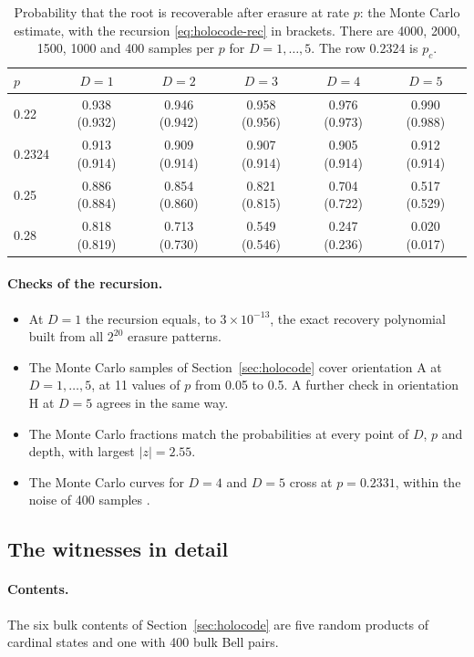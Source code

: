 \begin{table}[ht]\centering\small
\caption{Probability that the root is recoverable after erasure at rate $p$: the Monte Carlo estimate, with the recursion
\eqref{eq:holocode-rec} in brackets. There are 4000, 2000, 1500, 1000 and 400 samples per $p$ for $D=1,\dots,5$. The row $0.2324$
is $p_c$. }\label{tab:holocode-mc}
\begin{tabular}{lccccc}\toprule
$p$ & $D=1$ & $D=2$ & $D=3$ & $D=4$ & $D=5$ \\\midrule
0.22 & 0.938 (0.932) & 0.946 (0.942) & 0.958 (0.956) & 0.976 (0.973) & 0.990 (0.988) \\
0.2324 & 0.913 (0.914) & 0.909 (0.914) & 0.907 (0.914) & 0.905 (0.914) & 0.912 (0.914) \\
0.25 & 0.886 (0.884) & 0.854 (0.860) & 0.821 (0.815) & 0.704 (0.722) & 0.517 (0.529) \\
0.28 & 0.818 (0.819) & 0.713 (0.730) & 0.549 (0.546) & 0.247 (0.236) & 0.020 (0.017) \\\bottomrule
\end{tabular}
\end{table}

\paragraph{Checks of the recursion.}
\begin{itemize}[nosep]
\item At $D=1$ the recursion equals, to $3\times10^{-13}$, the exact recovery polynomial built from all $2^{20}$ erasure patterns.
\item The Monte Carlo samples of Section~\ref{sec:holocode} cover orientation A at $D=1,\dots,5$, at 11 values of $p$ from 0.05 to
  0.5. A further check in orientation H at $D=5$ agrees in the same way.
\item The Monte Carlo fractions match the probabilities at every point of $D$, $p$ and depth, with largest $|z|=2.55$.
\item The Monte Carlo curves for $D=4$ and $D=5$ cross at $p=0.2331$, within the noise of 400 samples .
\end{itemize}

\subsection{The witnesses in detail}\label{sec:holocode-witness}

\paragraph{Contents.} The six bulk contents of Section~\ref{sec:holocode} are five random products of cardinal states and one with 400
bulk Bell pairs.

